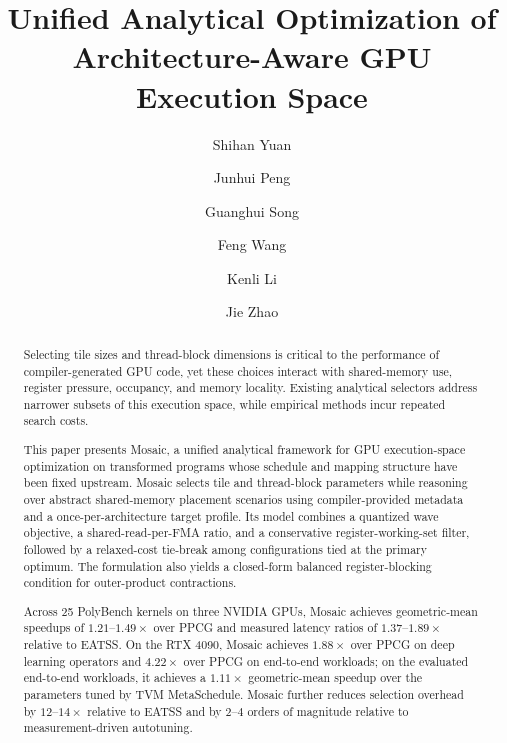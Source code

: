 \documentclass[acmsmall,review,anonymous,screen]{acmart}
\makeatletter
\newif\ifrevmarkup %
\DeclareRobustCommand{\revO}[1]{\ifrevmarkup{\color{revO}\hypersetup{allcolors=revO}#1}\else#1\fi} %
\DeclareRobustCommand{\revRone}[1]{\ifrevmarkup{\color{revRone}\hypersetup{allcolors=revRone}#1}\else#1\fi} %
\DeclareRobustCommand{\revRthree}[1]{\ifrevmarkup{\color{revRthree}\hypersetup{allcolors=revRthree}#1}\else#1\fi} %
\let\revO\@firstofone\let\revRone\@firstofone %
\newcommand{\name}{{Mosaic}\xspace}
\providecommand{\DIFaddbegin}{} %
\providecommand{\DIFaddend}{} %
\newcommand{\DIFaddincludegraphics}[2][]{{\color{blue}\fbox{\DIFOincludegraphics[#1]{#2}}}} %
\DeclareRobustCommand{\DIFaddbegin}{\DIFOaddbegin \let\includegraphics\DIFaddincludegraphics} %
\DeclareRobustCommand{\DIFaddend}{\DIFOaddend \let\includegraphics\DIFOincludegraphics} %
\makeatother
\begin{document}
\title[Analytical Optimization of Architecture-Aware GPU Code Generation]
{Unified Analytical Optimization of Architecture-Aware GPU Execution Space}

\author{Shihan Yuan}
\author{Junhui Peng}
\author{Guanghui Song}
\author{Feng Wang}
\author{Kenli Li}
\author{Jie Zhao}


\begin{abstract}
Selecting tile sizes and thread-block dimensions is critical to the performance of compiler-generated GPU code, yet these choices interact with shared-memory use, register pressure, occupancy, and memory locality. Existing analytical selectors address narrower subsets of this execution space, while empirical methods incur repeated search costs.

This paper presents \name, a unified analytical framework for GPU execution-space optimization on transformed programs whose schedule and mapping structure have been fixed upstream. \name selects tile and thread-block parameters while reasoning over abstract shared-memory placement scenarios using compiler-provided metadata and a once-per-architecture target profile. Its model combines a quantized wave objective, a shared-read-per-FMA ratio, and a conservative register-working-set filter, followed by a relaxed-cost tie-break among configurations tied at the primary optimum. The formulation also yields a closed-form balanced register-blocking condition for outer-product contractions.

Across 25 PolyBench kernels on three NVIDIA GPUs, \name achieves geometric-mean speedups of $1.21$--$1.49\times$ over PPCG and measured latency ratios of $1.37$--$1.89\times$ relative to \DIFaddbegin \revO{the energy-aware }\DIFaddend EATSS. On the RTX 4090, \name achieves $1.88\times$ over PPCG on deep learning operators and $4.22\times$ over PPCG on end-to-end workloads; on the evaluated end-to-end workloads, it achieves a $1.11\times$ geometric-mean speedup over \DIFaddbegin \revRthree{the parameters tuned by }\DIFaddend TVM MetaSchedule. \name further reduces selection overhead by $12$--$14\times$ relative to EATSS and by $2$--$4$ orders of magnitude relative to measurement-driven autotuning.
\end{abstract}
\end{document}
